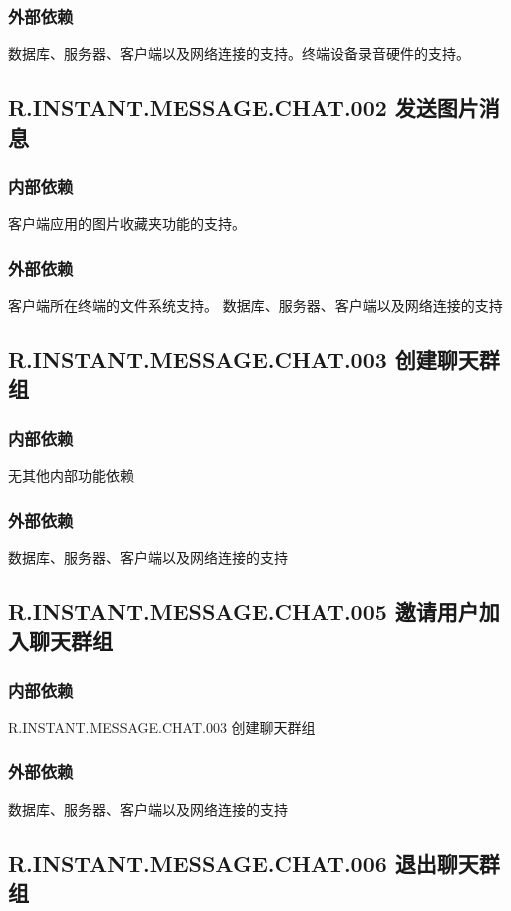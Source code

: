 \subsubsection{外部依赖}
    数据库、服务器、客户端以及网络连接的支持。终端设备录音硬件的支持。

\subsection{R.INSTANT.MESSAGE.CHAT.002 发送图片消息}
\subsubsection{内部依赖}
    客户端应用的图片收藏夹功能的支持。
\subsubsection{外部依赖}
    客户端所在终端的文件系统支持。
    数据库、服务器、客户端以及网络连接的支持

\subsection{R.INSTANT.MESSAGE.CHAT.003 创建聊天群组}
\subsubsection{内部依赖}
    无其他内部功能依赖
\subsubsection{外部依赖}
    数据库、服务器、客户端以及网络连接的支持

\subsection{R.INSTANT.MESSAGE.CHAT.005 邀请用户加入聊天群组}
\subsubsection{内部依赖}
    R.INSTANT.MESSAGE.CHAT.003 创建聊天群组
\subsubsection{外部依赖}
    数据库、服务器、客户端以及网络连接的支持

\subsection{R.INSTANT.MESSAGE.CHAT.006 退出聊天群组}
